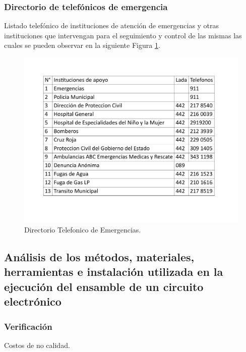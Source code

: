     \subsubsection{Directorio de telefónicos de emergencia}
    
    Listado telefónico de instituciones de atención de emergencias y otras instituciones que intervengan para el seguimiento y control de las mismas las cuales se pueden observar en la siguiente Figura \ref{fig:directorioEmergencias}.
    
    \begin{figure}[H]
        \centering
        \includegraphics[scale=0.3]{21/img/directorioEmergecias.pdf}
        \caption{Directorio Telefonico de Emergencias.}
        \label{fig:directorioEmergencias}
    \end{figure}
    
    \subsection{Análisis de los métodos, materiales, herramientas e instalación utilizada en la ejecución del ensamble de un circuito electrónico}
    
    \subsubsection{Verificación}
    
    Costos de no calidad.
